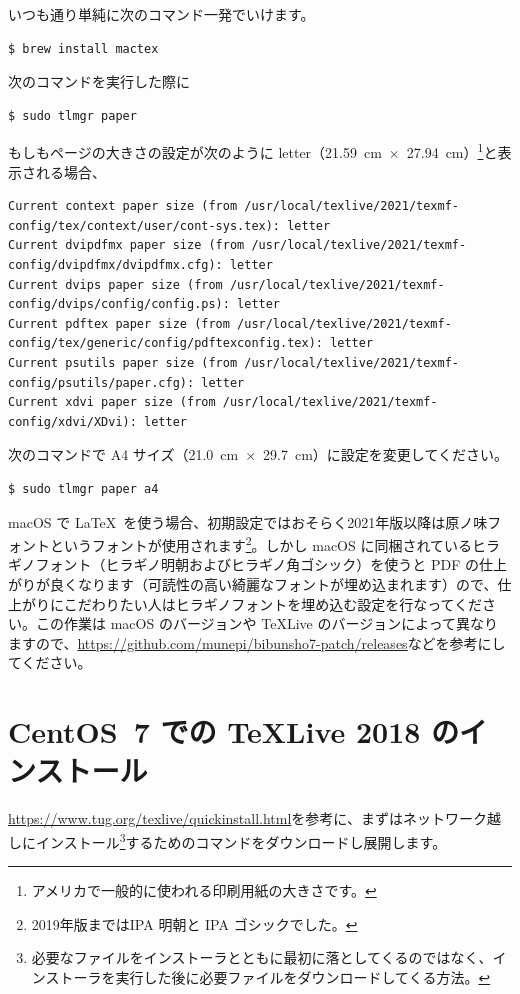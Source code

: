 いつも通り単純に次のコマンド一発でいけます。
\begin{lstlisting}[language=bash]
$ brew install mactex
\end{lstlisting}

次のコマンドを実行した際に
\begin{lstlisting}[language=bash]
$ sudo tlmgr paper
\end{lstlisting}
もしもページの大きさの設定が次のように letter（21.59~cm~$\times$~27.94~cm）\footnote{アメリカで一般的に使われる印刷用紙の大きさです。}と表示される場合、
\begin{lstlisting}
Current context paper size (from /usr/local/texlive/2021/texmf-config/tex/context/user/cont-sys.tex): letter
Current dvipdfmx paper size (from /usr/local/texlive/2021/texmf-config/dvipdfmx/dvipdfmx.cfg): letter
Current dvips paper size (from /usr/local/texlive/2021/texmf-config/dvips/config/config.ps): letter
Current pdftex paper size (from /usr/local/texlive/2021/texmf-config/tex/generic/config/pdftexconfig.tex): letter
Current psutils paper size (from /usr/local/texlive/2021/texmf-config/psutils/paper.cfg): letter
Current xdvi paper size (from /usr/local/texlive/2021/texmf-config/xdvi/XDvi): letter
\end{lstlisting}
次のコマンドで A4 サイズ（21.0~cm~$\times$~29.7~cm）に設定を変更してください。
\begin{lstlisting}[language=bash]
$ sudo tlmgr paper a4
\end{lstlisting}

macOS で \LaTeX\ を使う場合、初期設定ではおそらく2021年版以降は原ノ味フォントというフォントが使用されます\footnote{2019年版まではIPA 明朝と IPA ゴシックでした。}。しかし macOS に同梱されているヒラギノフォント（ヒラギノ明朝およびヒラギノ角ゴシック）を使うと PDF の仕上がりが良くなります（可読性の高い綺麗なフォントが埋め込まれます）ので、仕上がりにこだわりたい人はヒラギノフォントを埋め込む設定を行なってください。この作業は macOS のバージョンや TeXLive のバージョンによって異なりますので、\url{https://github.com/munepi/bibunsho7-patch/releases}などを参考にしてください。

\section{CentOS~7 での TeXLive 2018 のインストール}

\url{https://www.tug.org/texlive/quickinstall.html}を参考に、まずはネットワーク越しにインストール\footnote{必要なファイルをインストーラとともに最初に落としてくるのではなく、インストーラを実行した後に必要ファイルをダウンロードしてくる方法。}するためのコマンドをダウンロードし展開します。

